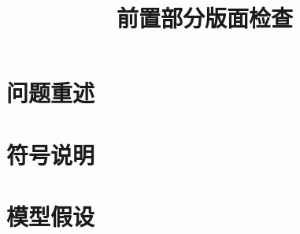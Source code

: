 \documentclass[withoutpreface]{cumcmthesis}
\title{前置部分版面检查}
\begin{document}
\section{问题重述}

\section{符号说明}

\section{模型假设}

\end{document}
